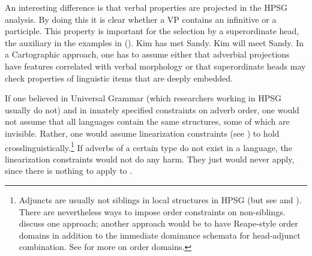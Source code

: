 \documentclass[output=paper
	        ,collection
	        ,collectionchapter
 	        ,biblatex
                ,babelshorthands
                ,newtxmath
                ,draftmode
                ,colorlinks, citecolor=brown
]{langscibook}
\begin{document}
An interesting difference is that verbal properties are projected in the HPSG analysis. By doing
this it is clear whether a VP contains an infinitive or a participle.
This property is important for the selection by a superordinate head, \eg the auxiliary in the examples
in (). 
\eal
\ex Kim has met Sandy.
\ex Kim will meet Sandy.
\zl
In a Cartographic approach, one has to assume either that adverbial projections have
features correlated with verbal morphology or that superordinate heads may check
properties of linguistic items that are deeply embedded.

If one believed in Universal Grammar (which researchers working
in HPSG usually do not) and in innately specified constraints on adverb order, one would not assume
that all languages contain the same structures, some of which are
invisible. Rather, one would assume linearization constraints (see
) to hold crosslinguistically.\footnote{%
  Adjuncts are usually not siblings in local structures in HPSG (but see \citealt{Kasper94a} and
  \citealt[, 71]{BvN98a}). There are nevertheless ways to
  impose order constraints on non-siblings. \citet*{EEU92a} discuss one approach; another approach
  would be to have Reape-style order domains \citep{Reape94a} in addition to the immediate dominance
  schemata for head-adjunct combination. See  for more on order domains.
} If adverbs
of a certain type do not exist in a language, the linearization constraints would not do any
harm. They just would never apply, since there is nothing to apply to \citep[]{MuellerCoreGram}.
\end{document}
